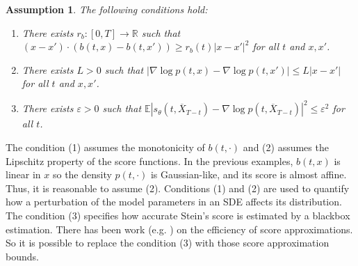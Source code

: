 \documentclass[letterpaper,10pt,reqno]{amsart}
\newtheorem{assump}[theorem]{Assumption}
\numberwithin{equation}{section}
\begin{document}
\begin{assump}
\label{assump:sensitivity}
The following conditions hold:
\begin{enumerate}[itemsep = 3 pt]
\item
There exists $r_b: [0,T] \to \mathbb{R}$ such that 
$(x - x') \cdot (b(t,x) - b(t,x')) \ge r_b(t) |x - x'|^2$ for all $t$ and $x,x'$.
\item
There exists $L > 0$ such that $|\nabla \log p(t,x) - \nabla \log p(t,x')| \le L |x-x'|$ for all $t$ and $x,x'$.
\item
There exists $\varepsilon > 0$ such that 
$\mathbb{E}|s_{\theta}(t,\overline{X}_{T-t}) - \nabla \log p(t,\overline{X}_{T-t})|^2 \le \varepsilon^2$ for all $t$.
\end{enumerate}
\end{assump}

\quad The condition (1) assumes the monotonicity of $b(t, \cdot)$
and (2) assumes the Lipschitz property of the score functions. 
In the previous examples, 
$b(t,x)$ is linear in $x$ 
so the density $p(t, \cdot)$ is Gaussian-like,
and its score is almost affine.
Thus, it is reasonable to assume (2).
Conditions (1) and (2) 
are used to quantify how a perturbation of the model parameters in an SDE
affects its distribution. 
The condition (3) specifies how accurate Stein's score is estimated by 
a blackbox estimation. 
There has been work (e.g. \cite{CH23, Koe22, Oko23}) on the efficiency of score approximations.
So it is possible to replace the condition (3) with those score approximation bounds.
\end{document}
